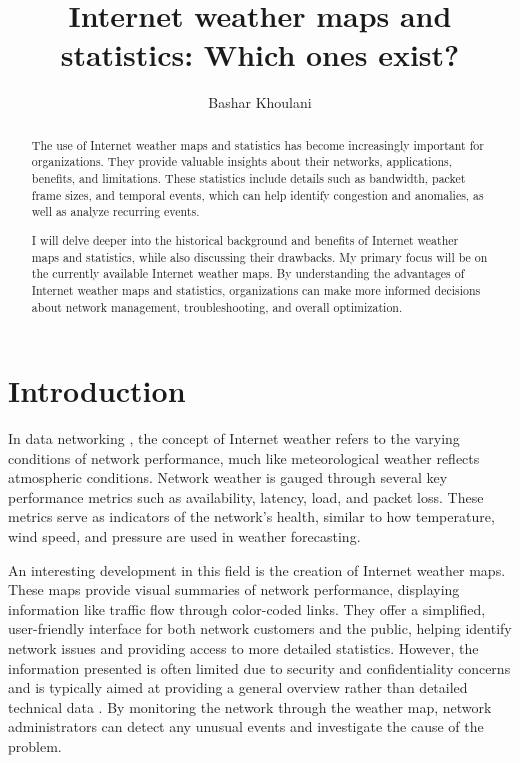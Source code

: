 \documentclass[sigconf,authorversion,nonacm]{acmart}
\begin{document}

\title{Internet weather maps and statistics: Which ones exist?}

\author{Bashar Khoulani}

\begin{abstract}
The use of Internet weather maps and statistics has become increasingly important for organizations. They provide valuable insights about their networks, applications, benefits, and limitations. These statistics include details such as bandwidth, packet frame sizes, and temporal events, which can help identify congestion and anomalies, as well as analyze recurring events.

I will delve deeper into the historical background and benefits of Internet weather maps and statistics, while also discussing their drawbacks. My primary focus will be on the currently available Internet weather maps. By understanding the advantages of Internet weather maps and statistics, organizations can make more informed decisions about network management, troubleshooting, and overall optimization.
\end{abstract}
\maketitle
\section{Introduction}

In data networking \cite{mundi}, the concept of Internet weather refers to the varying conditions of network performance, much like meteorological weather reflects atmospheric conditions. Network weather is gauged through several key performance metrics such as availability, latency, load, and packet loss. These metrics serve as indicators of the network's health, similar to how temperature, wind speed, and pressure are used in weather forecasting. 

An interesting development in this field is the creation of Internet weather maps. These maps provide visual summaries of network performance, displaying information like traffic flow through color-coded links. They offer a simplified, user-friendly interface for both network customers and the public, helping identify network issues and providing access to more detailed statistics. However, the information presented is often limited due to security and confidentiality concerns and is typically aimed at providing a general overview rather than detailed technical data \cite{mundi}. By monitoring the network through the weather map, network administrators can detect any unusual events and investigate the cause of the problem. 
\end{document}
